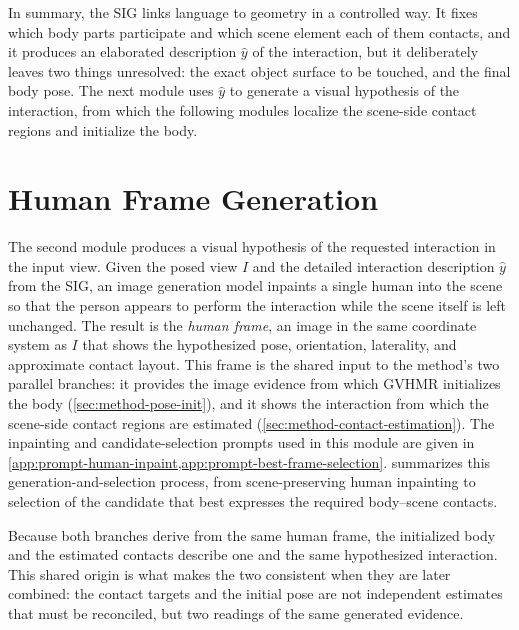 In summary, the SIG links language to geometry in a controlled way. It fixes which body parts participate and which scene element each of them contacts, and it produces an elaborated description $\hat{y}$ of the interaction, but it deliberately leaves two things unresolved: the exact object surface to be touched, and the final body pose. The next module uses $\hat{y}$ to generate a visual hypothesis of the interaction, from which the following modules localize the scene-side contact regions and initialize the body.


\section{Human Frame Generation}
\label{sec:method-human-frame}

The second module produces a visual hypothesis of the requested interaction in the input view. Given the posed view $I$ and the detailed interaction description $\hat{y}$ from the SIG, an image generation model inpaints a single human into the scene so that the person appears to perform the interaction while the scene itself is left unchanged. The result is the \emph{human frame}, an image in the same coordinate system as $I$ that shows the hypothesized pose, orientation, laterality, and approximate contact layout. This frame is the shared input to the method's two parallel branches: it provides the image evidence from which GVHMR initializes the body (\cref{sec:method-pose-init}), and it shows the interaction from which the scene-side contact regions are estimated (\cref{sec:method-contact-estimation}). The inpainting and candidate-selection prompts used in this module are given in \cref{app:prompt-human-inpaint,app:prompt-best-frame-selection}.  summarizes this generation-and-selection process, from scene-preserving human inpainting to selection of the candidate that best expresses the required body--scene contacts.

Because both branches derive from the same human frame, the initialized body and the estimated contacts describe one and the same hypothesized interaction. This shared origin is what makes the two consistent when they are later combined: the contact targets and the initial pose are not independent estimates that must be reconciled, but two readings of the same generated evidence.

